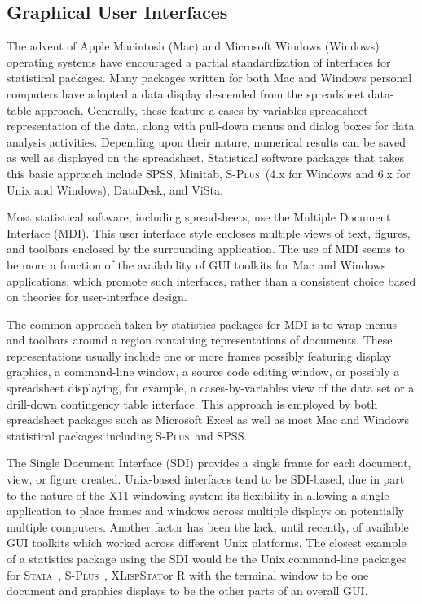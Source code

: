 \documentclass{article}
\newcommand*{\Splus}{\textsc{S-Plus}}
\newcommand*{\XLispStat}{\textsc{XLispStat}}
\newcommand*{\Stata}{\textsc{Stata}}
\begin{document}

\subsection{Graphical User Interfaces}
\label{sec:UI:GUI}

The advent of Apple Macintosh (Mac) and Microsoft Windows (Windows)
operating systems have encouraged a partial standardization of
interfaces for statistical packages.  Many packages written for both
Mac and Windows personal computers have adopted a data display
descended from the spreadsheet data-table approach.  Generally, these
feature a cases-by-variables spreadsheet representation of the data,
along with pull-down menus and dialog boxes for data analysis
activities.  Depending upon their nature, numerical results can be
saved as well as displayed on the spreadsheet.  Statistical software
packages that takes this basic approach include SPSS, Minitab, \Splus\ 
(4.x for Windows and 6.x for Unix and Windows), DataDesk, and ViSta.

Most statistical software, including spreadsheets, use the Multiple
Document Interface (MDI).  This user interface style encloses multiple
views of text, figures, and toolbars enclosed by the surrounding
application.  The use of MDI seems to be more a function of the
availability of GUI toolkits for Mac and Windows applications, which
promote such interfaces, rather than a consistent choice based on
theories for user-interface design.

The common approach taken by statistics packages for MDI is to wrap
menus and toolbars around a region containing representations of
documents.  These representations usually include one or more frames
possibly featuring display graphics, a command-line window, a source
code editing window, or possibly a spreadsheet displaying, for
example, a cases-by-variables view of the data set or a drill-down
contingency table interface.  This approach is employed by both
spreadsheet packages such as Microsoft Excel as well as most Mac and
Windows statistical packages including \Splus\ and SPSS.

The Single Document Interface (SDI) provides a single frame for each
document, view, or figure created.  Unix-based interfaces tend to be
SDI-based, due in part to the nature of the X11 windowing system its
flexibility in allowing a single application to place frames and
windows across multiple displays on potentially multiple computers.
Another factor has been the lack, until recently, of available GUI
toolkits which worked across different Unix platforms.  The closest
example of a statistics package using the SDI would be the Unix
command-line packages for \Stata\ , \Splus\ , \XLispStat or R with the
terminal window to be one document and graphics displays to be the
other parts of an overall GUI.
\end{document}

